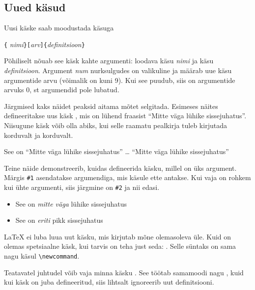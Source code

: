 \subsection{Uued käsud}

Uusi käske saab moodustada
käsuga
\begin{lscommand}
\verb|{|%
       \emph{nimi}\verb|}[|\emph{arv}\verb|]{|\emph{definitsioon}\verb|}|
\end{lscommand}
\noindent Põhiliselt nõuab see käsk kahte argumenti: loodava käsu
\emph{nimi} ja käsu \emph{definitsioon}. Argument \emph{num}
nurksulgudes on valikuline ja määrab uue käsu argumentide arvu (võimalik
on kuni 9). Kui see puudub, siis on argumentide arvuks 0, st argumendid
pole lubatud.

Järgmised kaks näidet peaksid aitama mõtet selgitada. Esimeses näites
defineeritakse uus käsk , mis on lühend fraasist "`Mitte väga
lühike \LaTeXe{} sissejuhatus"'. Niisugune käsk võib olla abiks, kui
selle raamatu pealkirja tuleb kirjutada korduvalt ja korduvalt.

\begin{example}
\newcommand{\mvl}{Mitte väga
    lühike \LaTeXe{}
    sissejuhatus}
See on "`\mvl"' \ldots{}
"`\mvl"'
\end{example}

Teine näide demonstreerib, kuidas defineerida käsku, millel on üks
argument. Märgis \verb|#1| asendatakse argumendiga, mis käsule ette
antakse. Kui vaja on rohkem kui ühte argumenti, siis järgmine on
\verb|#2| ja nii edasi.

\begin{example}
\newcommand{\xlit}[2]
 {See on \emph{#1}
  #2 \LaTeXe{} sissejuhatus}
\begin{itemize}
\item \xlit{mitte väga}{lühike}
\item \xlit{eriti}{pikk}
\end{itemize}
\end{example}

\LaTeX{} ei luba luua uut käsku, mis kirjutab mõne olemasoleva üle. Kuid
on olemas spetsiaalne käsk, kui tarvis on teha just seda:
. Selle süntaks on sama nagu käsul \verb|\newcommand|.

Teatavatel juhtudel võib vaja minna käsku . See
töötab samamoodi nagu , kuid kui käsk on juba
defineeritud, siis \LaTeXe{} lihtsalt ignoreerib uut definitsiooni.

